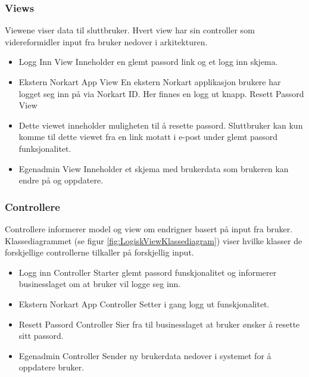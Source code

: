 \subsubsection{Views}
\label{subsec:logisk_view_views}
Viewene viser data til sluttbruker. Hvert view har sin controller som videreformidler input fra bruker nedover i arkitekturen.
\newline
\begin{itemize}
\item Logg Inn View
\newline Inneholder en glemt passord link og et logg inn skjema.
\item Ekstern Norkart App View
\newline En ekstern Norkart applikasjon brukere har logget seg inn på via Norkart ID. Her finnes en logg ut knapp.
Resett Passord View
\item Dette viewet inneholder muligheten til å resette passord. \newline Sluttbruker kan kun komme til dette viewet fra en link motatt i e-post under glemt passord funksjonalitet.
\item Egenadmin View
\newline Inneholder et skjema med brukerdata som brukeren kan endre på og oppdatere.
\end{itemize}

\bigskip
\subsubsection{Controllere}
\label{subsec:logisk_view_controllere}
Controllere informerer model og view om endrigner basert på input fra bruker. Klassediagrammet (se figur \ref{fig:LogiskViewKlassediagram}) viser hvilke klasser de forskjellige controllerne tilkaller på forskjellig input.
\newline
\begin{itemize}
\item Logg inn Controller 
\newline Starter glemt passord funskjonalitet og informerer businesslaget om at bruker vil logge seg inn.
\item Ekstern Norkart App Controller
\newline Setter i gang logg ut funskjonalitet. 
\item Resett Passord Controller
\newline Sier fra til businesslaget at bruker ønsker å resette sitt passord.
\item Egenadmin Controller 
\newline Sender ny brukerdata nedover i systemet for å oppdatere bruker.
\end{itemize}


